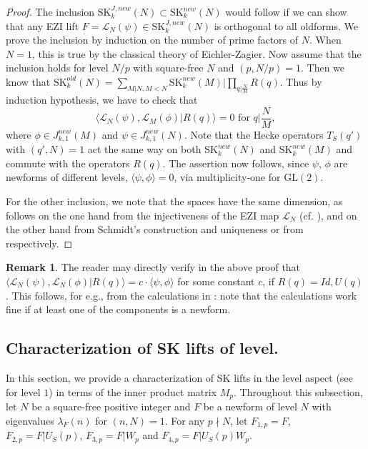 \documentclass[11pt]{amsart}
\numberwithin{equation}{section}
\theoremstyle{plain}
\theoremstyle{definition}
\newtheorem{rmk}[thm]{Remark}
\newcommand{\mc}{\mathcal}
\newcommand{\mrm}{\mathrm}
\newcommand{\lan}{\langle }
\newcommand{\ran}{\rangle}
\newcommand{\GL}{\mrm{GL}}
\newcommand{\skk}{\mrm{SK}_k}
\begin{document}
\begin{proof}
The inclusion $\skk^{J,new}(N) \subset \skk^{new}(N) $ would follow if we can show that any EZI lift $F = \mc L_N(\psi) \in \skk^{J,new}(N)$ is orthogonal to all oldforms. We prove the inclusion by induction on the number of prime factors of $N$. When $N=1$, this is true by the classical theory of Eichler-Zagier. Now assume that the inclusion holds for level $N/p$ with square-free $N$ and $(p,N/p)=1$. Then we know that $\skk^{old}(N)=\sum_{M|N, M<N}\skk^{new}(M)|\prod_{q|\frac{N}{M}} R(q)$.
Thus by induction hypothesis, we have to check that 
\begin{equation}
    \lan \mc L_{N}(\psi) , \mc L_{M}(\phi)|R(q) \ran=0 \text{ for } q|\frac{N}{M},
\end{equation}
where $\phi\in J_{k,1}^{new}(M)$ and $\psi\in J_{k,1}^{new}(N)$. Note that the Hecke operators $T_S(q')$ with $(q',N)=1$ act the same way on both $\skk^{new}(N)$ and $\skk^{new}(M)$ and commute with the operators $R(q)$. The assertion now follows, since $\psi$, $\phi$ are newforms of different levels, $\lan \psi, \phi \ran =0$, via multiplicity-one for $\GL(2)$.

For the other inclusion, we note that the spaces have the same dimension, as follows on the one hand from the injectiveness of the EZI map $\mc L_N$ (cf. \cite{Ibu-SK}), and on the other hand from Schmidt's construction and uniqueness \cite[Thm.~5.2~(ii)]{schmidt-SKlift} or from \cite[Lem.5.2.2]{saha-paul} respectively.
\end{proof}

\begin{rmk}
    The reader may directly verify in the above proof that $\displaystyle \lan \mc L_{N}(\psi), \mc L_{N}(\phi)|R(q) \ran = c \cdot \lan \psi, \phi \ran$ for some constant $c$, if $R(q)=Id, U(q)$. This follows, for e.g., from the calculations in \cite{Ag-Br}: note that the calculations work fine if at least one of the components is a newform. 
\end{rmk}

\subsection{Characterization of SK lifts of level.}

In this section, we provide a characterization of SK lifts in the level aspect (see \cite{farmer2013survey} for level $1$) in terms of the inner product matrix $M_p$. Throughout this subsection, let $N$ be a square-free positive integer and $F$ be a newform of level $N$ with eigenvalues $\lambda_F(n)$ for $(n,N)=1$. For any $p\nmid N$, let $F_{1,p}=F$, $F_{2,p}=F|U_S(p)$, $F_{3,p}=F|W_p$ and $F_{4,p}=F|U_S(p)W_p$. 
\end{document}
